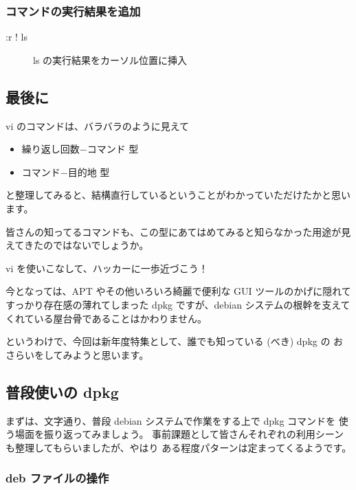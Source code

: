 \documentclass[mingoth,a4paper]{jsarticle}
\begin{document}
\subsubsection{コマンドの実行結果を追加}
\begin{description}
\item[:r ! ls] ls の実行結果をカーソル位置に挿入
\end{description}

\subsection{最後に}

vi のコマンドは、バラバラのように見えて
\begin{itemize}
      \item 繰り返し回数−コマンド 型
      \item コマンド−目的地 型
\end{itemize}

と整理してみると、結構直行しているということがわかっていただけたかと思います。

皆さんの知ってるコマンドも、この型にあてはめてみると知らなかった用途が見えてきたのではないでしょうか。

vi を使いこなして、ハッカーに一歩近づこう！


今となっては、APT やその他いろいろ綺麗で便利な GUI ツールのかげに隠れて
すっかり存在感の薄れてしまった dpkg ですが、debian システムの根幹を支えて
くれている屋台骨であることはかわりません。

というわけで、今回は新年度特集として、誰でも知っている (べき) dpkg の
おさらいをしてみようと思います。

\subsection{普段使いの dpkg}

まずは、文字通り、普段 debian システムで作業をする上で dpkg コマンドを
使う場面を振り返ってみましょう。
事前課題として皆さんそれぞれの利用シーンも整理してもらいましたが、やはり
ある程度パターンは定まってくるようです。

\subsubsection{deb ファイルの操作}
\end{document}
